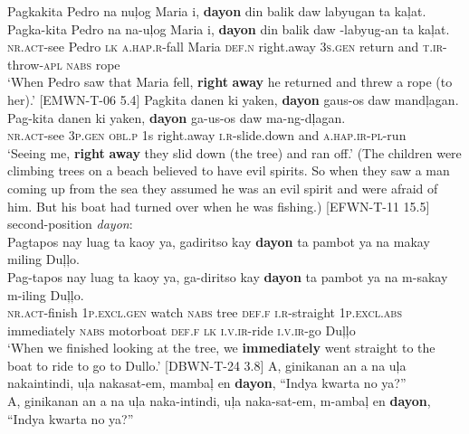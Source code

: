 \ea
Pagkakita    Pedro  na  nuļog  Maria  i,  \textbf{dayon}  din balik daw  labyugan  ta  kaļat. \\\smallskip
 \gll Pagka-kita    Pedro  na  na-uļog  Maria  i,  \textbf{dayon}  din balik daw  \emptyset{}-labyug-an  ta  kaļat. \\
\textsc{nr.act}-see  Pedro  \textsc{lk}  \textsc{a.hap.r}-fall  Maria  \textsc{def.n}  right.away  3\textsc{s.gen} return and  \textsc{t.ir}-throw-\textsc{apl}  \textsc{nabs}  rope \\
\glt `When Pedro saw that Maria fell, \textbf{right} \textbf{away} he returned and threw a rope (to her).’ [EMWN-T-06 5.4]
\z
\ea
\label{bkm:Ref425607917}
Pagkita  danen  ki  yaken,  \textbf{dayon}  gaus-os daw mandļagan. \\\smallskip
 \gll Pag-kita  danen  ki  yaken,  \textbf{dayon}  ga-us-os daw ma-ng-dļagan. \\
\textsc{nr.act}-see  3\textsc{p.gen}  \textsc{obl.p}  1s  right.away  \textsc{i.r}-slide.down
and \textsc{a.hap.ir-pl}-run \\
\glt ‘Seeing me, \textbf{right} \textbf{away} they slid down (the tree) and ran off.’ (The children were climbing trees on a beach believed to have evil spirits. So when they saw a man coming up from the sea they assumed he was an evil spirit and were afraid of him. But his boat had turned over when he was fishing.) [EFWN-T-11 15.5]
\z
\ea
\label{bkm:Ref425607938}
second-position \textit{dayon}: \\
Pagtapos  nay  luag  ta  kaoy  ya,  gadiritso kay \textbf{dayon}  ta  pambot  ya  na  makay  miling  Duļļo. \\\smallskip
 \gll Pag-tapos  nay  luag  ta  kaoy  ya,  ga-diritso kay \textbf{dayon}  ta  pambot  ya  na  m-sakay  m-iling  Duļļo. \\
\textsc{nr.act}-finish  1\textsc{p.excl.gen}  watch  \textsc{nabs}  tree  \textsc{def.f}  \textsc{i.r}-straight 1\textsc{p.excl.abs}
immediately  \textsc{nabs}  motorboat  \textsc{def.f}  \textsc{lk}  \textsc{i.v.ir-}ride  \textsc{i.v.ir}-go  Duļļo \\
\glt ‘When we finished looking at the tree, we \textbf{immediately} went straight to the boat to ride to go to Dullo.’ [DBWN-T-24 3.8]
\z
\ea
A,  ginikanan  an  a  na  uļa  nakaintindi,  uļa  nakasat-em,    mambaļ  en  \textbf{dayon},  “Indya  kwarta  no  ya?” \\\smallskip
 \gll A,  ginikanan  an  a  na  uļa  naka-intindi,  uļa  naka-sat-em,    m-ambaļ  en  \textbf{dayon},  “Indya  kwarta  no  ya?” \\
